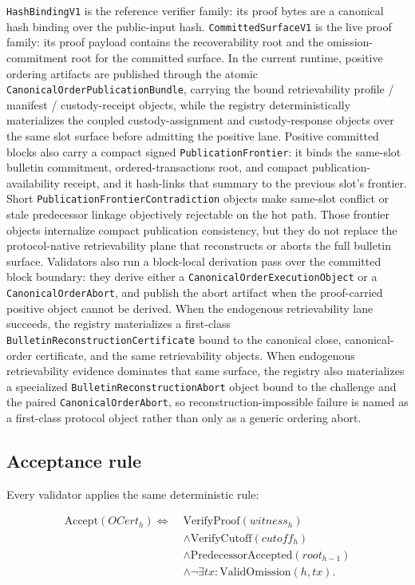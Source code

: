 \documentclass[11pt]{article}
\newcommand{\code}[1]{\texttt{#1}}
\begin{document}
\code{HashBindingV1} is the reference verifier family: its proof bytes are a
canonical hash binding over the public-input hash. \code{CommittedSurfaceV1}
is the live proof family: its proof payload contains the recoverability root
and the omission-commitment root for the committed surface. In the current
runtime, positive ordering artifacts are published through the atomic
\code{CanonicalOrderPublicationBundle}, carrying the bound retrievability
profile / manifest / custody-receipt objects, while the registry
deterministically materializes the coupled custody-assignment and
custody-response objects over the same slot surface before admitting the
positive lane. Positive committed
blocks also carry a compact signed \code{PublicationFrontier}: it binds the
same-slot bulletin commitment, ordered-transactions root, and compact
publication-availability receipt, and it hash-links that summary to the
previous slot's frontier. Short \code{PublicationFrontierContradiction}
objects make same-slot conflict or stale predecessor linkage objectively
rejectable on the hot path. Those frontier objects internalize compact
publication consistency, but they do not replace the protocol-native
retrievability plane that reconstructs or aborts the full bulletin surface.
Validators also run a block-local derivation pass over
the committed block boundary: they derive either a
\code{CanonicalOrderExecutionObject} or a \code{CanonicalOrderAbort}, and
publish the abort artifact when the proof-carried positive object cannot be
derived. When the endogenous retrievability lane succeeds, the registry
materializes a first-class \code{BulletinReconstructionCertificate} bound to
the canonical close, canonical-order certificate, and the same retrievability
objects. When endogenous retrievability evidence dominates that same surface,
the registry also materializes a specialized
\code{BulletinReconstructionAbort} object bound to the challenge and the paired
\code{CanonicalOrderAbort}, so reconstruction-impossible failure is named as a
first-class protocol object rather than only as a generic ordering abort.

\subsection{Acceptance rule}

Every validator applies the same deterministic rule:

\[
\begin{aligned}
\mathrm{Accept}(OCert_h)
\iff\;& \mathrm{VerifyProof}(witness_h) \\
&\wedge \mathrm{VerifyCutoff}(cutoff_h) \\
&\wedge \mathrm{PredecessorAccepted}(root_{h-1}) \\
&\wedge \neg \exists tx : \mathrm{ValidOmission}(h, tx).
\end{aligned}
\]
\end{document}
